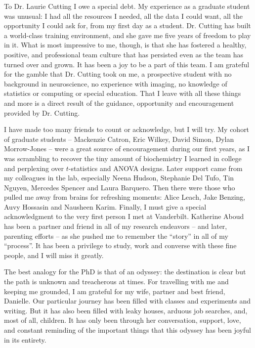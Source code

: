 \documentclass[12pt]{report}  %
\begin{document}
To Dr. Laurie Cutting I owe a special debt. My experience as a graduate student was unusual: I had all the resources I needed, all the data I could want, all the opportunity I could ask for, from my first day as a student. Dr. Cutting has built a world-class training environment, and she gave me five years of freedom to play in it. What is most impressive to me, though, is that she has fostered a healthy, positive, and professional team culture that has persisted even as the team has turned over and grown. It has been a joy to be a part of this team. I am grateful for the gamble that Dr. Cutting took on me, a prospective student with no background in neuroscience, no experience with imaging, no knowledge of statistics or computing or special education. That I leave with all these things and more is a direct result of the guidance, opportunity and encouragement provided by Dr. Cutting.

I have made too many friends to count or acknowledge, but I will try. My cohort of graduate students -- Mackenzie Catron, Eric Wilkey, David Simon, Dylan Morrow-Jones -- were a great source of encouragement during our first years, as I was scrambling to recover the tiny amount of biochemistry I learned in college and perplexing over $t$-statistics and ANOVA designs. Later support came from my colleagues in the lab, especially Neena Hudson, Stephanie Del Tufo, Tin Nguyen, Mercedes Spencer and Laura Barquero. Then there were those who pulled me away from brains for refreshing moments: Alice Leach, Jake Benzing, Auvy Hossasin and Nausheen Karim. Finally, I must give a special acknowledgment to the very first person I met at Vanderbilt. Katherine Aboud has been a partner and friend in all of my research endeavors -- and later, parenting efforts -- as she pushed me to remember the ``story'' in all of my ``process''. It has been a privilege to study, work and converse with these fine people, and I will miss it greatly. 

The best analogy for the PhD is that of an odyssey: the destination is clear but the path is unknown and treacherous at times. For travelling with me and keeping me grounded, I am grateful for my wife, partner and best friend, Danielle. Our particular journey has been filled with classes and experiments and writing. But it has also been filled with leaky houses, arduous job searches, and, most of all, children. It has only been through her conversation, support, love, and constant reminding of the important things that this odyssey has been joyful in its entirety.
\end{document}
